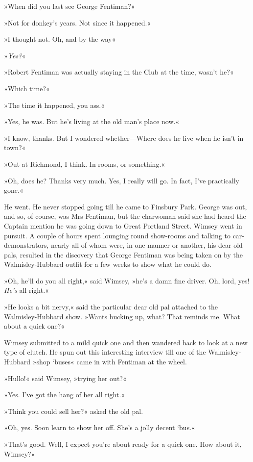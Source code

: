 »When did you last see George Fentiman?«

»Not for donkey's years. Not since it happened.«

»I thought not. Oh, and by the way\longdash«

»\textit{Yes?}«

»Robert Fentiman was actually staying in the Club at the time, wasn't he?«

»Which time?«

»The time it happened, you ass.«

»Yes, he was. But he's living at the old man's place now.«

»I know, thanks. But I wondered whether—Where does he live when he isn't in town?«

»Out at Richmond, I think. In rooms, or something.«

»Oh, does he? Thanks very much. Yes, I really will go. In fact, I've practically gone.«

He went. He never stopped going till he came to Finsbury Park. George was out, and so, of course, was Mrs Fentiman, but the charwoman said she had heard the Captain mention he was going down to Great Portland Street. Wimsey went in pursuit. A couple of hours spent lounging round show-rooms and talking to car-demonstrators, nearly all of whom were, in one manner or another, his dear old pals, resulted in the discovery that George Fentiman was being taken on by the Walmisley-Hubbard outfit for a few weeks to show what he could do.

»Oh, he'll do you all right,« said Wimsey, »he's a damn fine driver. Oh, lord, yes! \textit{He's} all right.«

»He looks a bit nervy,« said the particular dear old pal attached to the Walmisley-Hubbard show. »Wants bucking up, what? That reminds me. What about a quick one?«

Wimsey submitted to a mild quick one and then wandered back to look at a new type of clutch. He spun out this interesting interview till one of the Walmisley-Hubbard »shop `buses« came in with Fentiman at the wheel.

»Hullo!« said Wimsey, »trying her out?«

»Yes. I've got the hang of her all right.«

»Think you could sell her?« asked the old pal.

»Oh, yes. Soon learn to show her off. She's a jolly decent `bus.«

»That's good. Well, I expect you're about ready for a quick one. How about it, Wimsey?«


